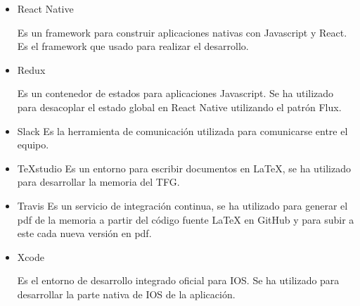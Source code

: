 \begin{itemize}
	\item React Native~\cite{RENA}~\cite{REACTBOOK}
	
	Es un framework para construir aplicaciones nativas con Javascript y React. Es el framework que usado
	 para realizar el desarrollo.
	
	\item Redux~\cite{REDUX}
	
	Es un contenedor de estados para aplicaciones Javascript. Se ha utilizado para desacoplar el estado 
	global en React Native utilizando el patrón Flux.
	
	\item Slack
	Es la herramienta de comunicación utilizada para comunicarse entre el equipo.
	
	\item TeXstudio
	Es un entorno para escribir documentos en \LaTeX{}, se ha utilizado para desarrollar la 
	memoria del TFG.
	
	\item Travis
	Es un servicio de integración continua, se ha utilizado para generar el pdf de la memoria a partir del código 
	fuente \LaTeX{} en GitHub y para subir a este cada nueva versión en pdf.
	
	\item Xcode~\cite{XCODE}
	
	Es el entorno de desarrollo integrado oficial para IOS. Se ha utilizado para desarrollar la parte nativa 
	de IOS de la aplicación.
	
\end{itemize}


